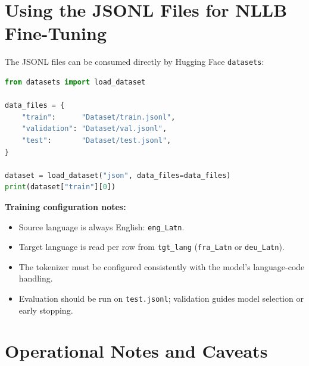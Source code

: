 \documentclass[12pt,a4paper]{article}
\begin{document}
\section{Using the JSONL Files for NLLB Fine-Tuning}

The JSONL files can be consumed directly by Hugging Face \texttt{datasets}:

\begin{lstlisting}[language=Python, caption={Loading the dataset splits with Hugging Face.}]
from datasets import load_dataset

data_files = {
    "train":      "Dataset/train.jsonl",
    "validation": "Dataset/val.jsonl",
    "test":       "Dataset/test.jsonl",
}

dataset = load_dataset("json", data_files=data_files)
print(dataset["train"][0])
\end{lstlisting}

\begin{infobox}
\textbf{Training configuration notes:}
\begin{itemize}
  \item Source language is always English: \texttt{eng\_Latn}.
  \item Target language is read per row from \texttt{tgt\_lang} (\texttt{fra\_Latn} or \texttt{deu\_Latn}).
  \item The tokenizer must be configured consistently with the model's language-code handling.
  \item Evaluation should be run on \texttt{test.jsonl}; validation guides model selection or early stopping.
\end{itemize}
\end{infobox}

\section{Operational Notes and Caveats}
\end{document}
